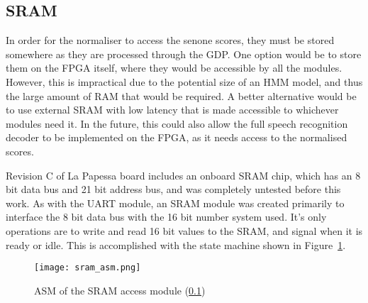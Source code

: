 	\subsection{SRAM} %
	\label{sub:onboard_sram}
		In order for the normaliser to access the senone scores, they must be stored somewhere as they are processed through the GDP.  One option would be to store them on the FPGA itself, where they would be accessible by all the modules.  However, this is impractical due to the potential size of an HMM model, and thus the large amount of RAM that would be required.  A better alternative would be to use external SRAM with low latency that is made accessible to whichever modules need it.  In the future, this could also allow the full speech recognition decoder to be implemented on the FPGA, as it needs access to the normalised scores.

		Revision C of La Papessa board includes an onboard SRAM chip, which has an 8 bit data bus and 21 bit address bus, and was completely untested before this work.  As with the UART module, an SRAM module was created primarily to interface the 8 bit data bus with the 16 bit number system used.  It's only operations are to write and read 16 bit values to the SRAM, and signal when it is ready or idle.  This is accomplished with the state machine shown in Figure~\ref{fig:sram_asm}.

		\begin{figure}[tb]
			\begin{center}
				\texttt{[image: sram\_asm.png]}
			\end{center}
			\caption{ASM of the SRAM access module (\ref{sub:onboard_sram})}
			\label{fig:sram_asm}
		\end{figure}

